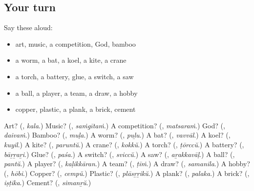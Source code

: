 \subsection*{Your turn}
Say these aloud:

\begin{itemize}
\raggedright
  \item art, music, a competition, God, bamboo
  \item a worm, a bat, a koel, a kite, a crane
  \item a torch, a battery, glue, a switch, a saw
  \item a ball, a player, a team, a draw, a hobby
  \item copper, plastic, a plank, a brick, cement
\end{itemize}

\begin{tcolorbox}[breakable,colback=teal!4,colframe=teal!35!black,title={Before you move on}]
Art? (\textbf{}, \emph{kala}.) Music? (\textbf{}, \emph{saṁgītaṁ}.) A competition? (\textbf{}, \emph{matsaraṁ}.) God? (\textbf{}, \emph{daivaṁ}.) Bamboo? (\textbf{}, \emph{muḷa}.) A worm? (\textbf{}, \emph{puḻu}.) A bat? (\textbf{}, \emph{vavvāl}.) A koel? (\textbf{}, \emph{kuyil}.) A kite? (\textbf{}, \emph{paruntŭ}.) A crane? (\textbf{}, \emph{kokkŭ}.) A torch? (\textbf{}, \emph{ṭōrccŭ}.) A battery? (\textbf{}, \emph{bāṟṟaṟi}.) Glue? (\textbf{}, \emph{paśa}.) A switch? (\textbf{}, \emph{sviccŭ}.) A saw? (\textbf{}, \emph{aṟakkavāḷ}.) A ball? (\textbf{}, \emph{pantŭ}.) A player? (\textbf{}, \emph{kaḷikkāran}.) A team? (\textbf{}, \emph{ṭīṁ}.) A draw? (\textbf{}, \emph{samanila}.) A hobby? (\textbf{}, \emph{hōbi}.) Copper? (\textbf{}, \emph{cempŭ}.) Plastic? (\textbf{}, \emph{plāsṟṟikŭ}.) A plank? (\textbf{}, \emph{palaka}.) A brick? (\textbf{}, \emph{iṣṭika}.) Cement? (\textbf{}, \emph{simanṟŭ}.)
\end{tcolorbox}
